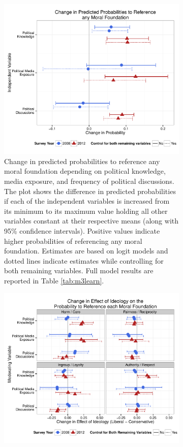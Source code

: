\documentclass[12pt]{article}
\begin{document}
\begin{figure}[h]
  \centering
  \caption{Models predicting probabilities to reference any moral foundation including 2008 ANES data.}
  \begin{subfigure}[t]{0.49\textwidth}
    \includegraphics[scale=.4]{../calc/fig/appD7learn.pdf}
    \caption{Change in predicted probabilities to reference any moral foundation depending on political knowledge, media exposure, and frequency of political discussions. The plot shows the difference in predicted probabilities if each of the independent variables is increased from its minimum to its maximum value holding all other variables constant at their respective means (along with 95\% confidence intervals). Positive values indicate higher probabilities of referencing any moral foundation. Estimates are based on logit models and dotted lines indicate estimates while controlling for both remaining variables. Full model results are reported in Table \ref{tab:m3learn}.}\label{fig:appD7learn}
  \end{subfigure}
  \begin{subfigure}[t]{0.49\textwidth}
    \includegraphics[scale=.4]{../calc/fig/appD8ideolearn.pdf}

\end{subfigure}
\end{figure}
\end{document}
